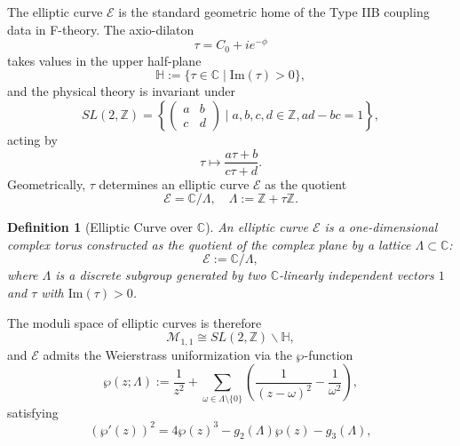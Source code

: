 \documentclass[11pt]{article}
\newtheorem{definition}[theorem]{Definition}
\theoremstyle{remark}
\newcommand{\calE}{\mathcal{E}}
\begin{document}
The elliptic curve \(\calE\) is the standard geometric home of the Type IIB coupling data in F-theory. The axio-dilaton
\begin{equation}
\tau = C_0 + i e^{-\phi}
\end{equation}
takes values in the upper half-plane
\begin{equation}
\mathbb{H} := \{ \tau \in \mathbb{C} \mid \mathrm{Im}(\tau) > 0 \},
\end{equation}
and the physical theory is invariant under
\begin{equation}
SL(2,\mathbb{Z}) = \left\{ \begin{pmatrix} a & b \\ c & d \end{pmatrix} \mid a,b,c,d \in \mathbb{Z}, ad - bc = 1 \right\},
\end{equation}
acting by
\begin{equation}
\tau \mapsto \frac{a \tau + b}{c \tau + d}.
\end{equation}
Geometrically, \(\tau\) determines an elliptic curve \(\calE\) as the quotient
\begin{equation}
\calE = \mathbb{C} / \Lambda, \quad \Lambda := \mathbb{Z} + \tau \mathbb{Z}.
\end{equation}
\begin{definition}[Elliptic Curve over \(\mathbb{C}\)]
An elliptic curve \(\calE\) is a one-dimensional complex torus constructed as the quotient of the complex plane by a lattice \(\Lambda \subset \mathbb{C}\):
\begin{equation}
\calE := \mathbb{C} / \Lambda,
\end{equation}
where \(\Lambda\) is a discrete subgroup generated by two \(\mathbb{C}\)-linearly independent vectors \(1\) and \(\tau\) with \(\mathrm{Im}(\tau) > 0\).
\end{definition}
The moduli space of elliptic curves is therefore
\begin{equation}
\mathcal{M}_{1,1} \cong SL(2,\mathbb{Z}) \backslash \mathbb{H},
\end{equation}
and \(\calE\) admits the Weierstrass uniformization via the \(\wp\)-function
\begin{equation}
\wp(z;\Lambda) := \frac{1}{z^2} + \sum_{\omega \in \Lambda \setminus \{0\}} \left( \frac{1}{(z-\omega)^2} - \frac{1}{\omega^2} \right),
\end{equation}
satisfying
\begin{equation}
(\wp'(z))^{2} = 4 \wp(z)^3 - g_2(\Lambda) \wp(z) - g_3(\Lambda),
\end{equation}
\end{document}
